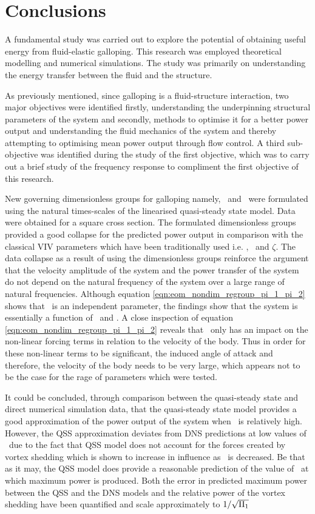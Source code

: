 \chapter{Conclusions}

A fundamental study was carried out to explore the potential of obtaining useful energy from fluid-elastic galloping. This research was employed theoretical modelling and numerical simulations. The study was primarily on understanding the energy transfer between the fluid and the structure.  

As previously mentioned, since  galloping is a fluid-structure interaction, two major objectives were identified firstly, understanding the underpinning structural parameters of the system and secondly, methods to optimise it for a better power output and understanding the fluid mechanics of the system and thereby attempting to optimising mean power output through flow control. A third sub-objective was identified during the study of the first objective, which was to carry out a brief study of the frequency response to compliment the first objective of this research.  

New governing dimensionless groups for galloping namely, \massstiff\ and \massdamp\ were formulated using the natural times-scales of the linearised quasi-steady state model. Data were obtained for a square cross section. The formulated dimensionless groups provided a good collapse for the predicted power output in comparison with the classical VIV parameters which have been traditionally used i.e. \ustar, \mstar\ and $\zeta$. The data collapse as a result of using the dimensionless groups reinforce the argument that the velocity amplitude of the system and the power transfer of the system do not depend on the natural frequency of the system over a large range of natural frequencies. Although equation \ref{eqn:eom_nondim_regroup_pi_1_pi_2} shows that \mstar\ is an independent parameter, the findings show that the system is essentially a function of \massstiff\ and \massdamp. A close inspection of equation \ref{eqn:eom_nondim_regroup_pi_1_pi_2} reveals that \mstar\ only has an impact on the non-linear forcing terms in relation to the velocity of the body. Thus in order for these non-linear terms to be significant, the induced angle of attack and therefore, the velocity of the body needs to be very large, which appears not to be the case for the rage of parameters which were tested. 

 It could be concluded, through comparison between the quasi-steady state and direct numerical simulation data, that the quasi-steady state model provides a good approximation of the power output of the system when \massstiff\ is relatively high. However, the QSS approximation deviates from  DNS predictions at low values of \massstiff\ due to the fact that QSS model does not account for the forces created by vortex shedding which is shown to increase in influence as \massstiff\ is decreased. Be that as it may, the QSS model does provide a reasonable prediction of the value of \massdamp\ at which maximum power is produced. Both the error in predicted maximum power between the QSS and the DNS models and the relative power of the vortex shedding have been quantified and scale approximately to $1/\sqrt{\Pi_1}$  
 
